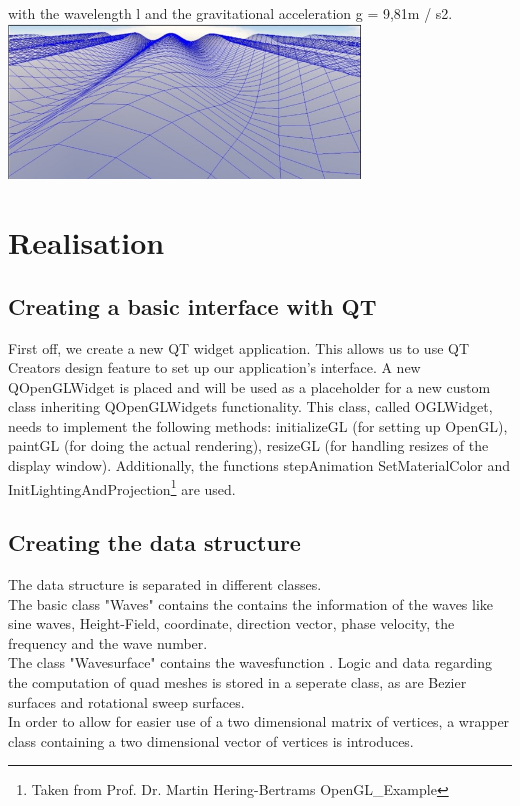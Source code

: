 \documentclass[12pt,a4paper]{scrartcl}
\begin{document}
with the wavelength l and the gravitational acceleration g = 9,81m / s2. \\

\includegraphics[width=0.7\textwidth]{Images/SinWaves.jpg}

\section{Realisation}

\subsection{Creating a basic interface with QT}
First off, we create a new QT widget application. This allows us to use QT Creators design feature to set up our application's interface. A new QOpenGLWidget is placed and will be used as a placeholder for a new custom class inheriting QOpenGLWidgets functionality. This class, called OGLWidget, needs to implement the following methods: initializeGL (for setting up OpenGL), paintGL (for doing the actual rendering), resizeGL (for handling resizes of the display window). Additionally, the functions stepAnimation SetMaterialColor and InitLightingAndProjection\footnote{Taken from Prof. Dr. Martin Hering-Bertrams OpenGL_Example} are used.

\subsection{Creating the data structure}
The data structure is separated in different classes. \\
The basic class "Waves" contains the contains the information of the waves like sine waves, Height-Field, coordinate, direction vector, phase velocity, the frequency and the wave number.  \\ 
The class "Wavesurface" contains the wavesfunction . 
Logic and data regarding the computation of quad meshes is stored in a seperate class, as are Bezier surfaces and rotational sweep surfaces. \\
In order to allow for easier use of a two dimensional matrix of vertices, a wrapper class containing a two dimensional vector of vertices is introduces. \\
\end{document}
